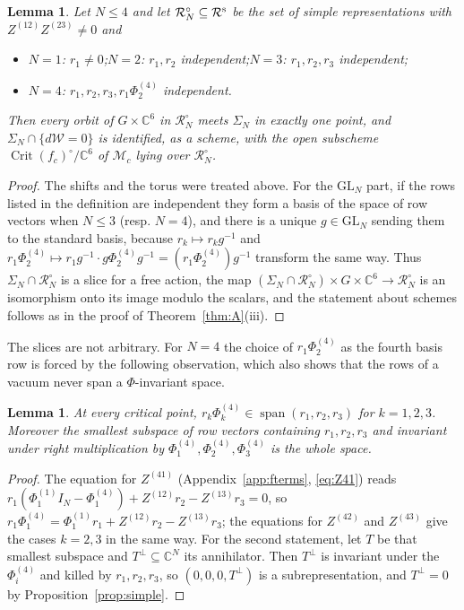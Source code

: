 \documentclass[11pt]{amsart}
\newtheorem{lemma}[theorem]{Lemma}
\theoremstyle{definition}
\newcommand{\CC}{\mathbb{C}}
\newcommand{\Crit}{\operatorname{Crit}}
\newcommand{\cM}{\mathcal M}
\newcommand{\cR}{\mathcal R}
\newcommand{\cW}{\mathcal W}
\newcommand{\GL}{\mathrm{GL}}
\begin{document}
\begin{lemma}\label{lem:slice}
Let $N\le 4$ and let $\cR^\circ_N\subseteq\cR^{\rm s}$ be the set of simple representations with $Z^{(12)}Z^{(23)}\ne0$ and
\begin{itemize}
\item $N=1$: $r_1\ne0$;\quad $N=2$: $r_1,r_2$ independent;\quad $N=3$: $r_1,r_2,r_3$ independent;
\item $N=4$: $r_1,r_2,r_3,r_1\Phi^{(4)}_2$ independent.
\end{itemize}
Then every orbit of $G\times\CC^6$ in $\cR^\circ_N$ meets $\Sigma_N$ in exactly one point, and $\Sigma_N\cap\{d\cW=0\}$ is identified, as a scheme, with the open subscheme $\Crit(f_c)^\circ/\CC^6$ of $\cM_c$ lying over $\cR^\circ_N$.
\end{lemma}

\begin{proof}
The shifts and the torus were treated above. For the $\GL_N$ part, if the rows listed in the definition are independent they form a basis of the space of row vectors when $N\le 3$ (resp. $N=4$), and there is a unique $g\in\GL_N$ sending them to the standard basis, because $r_k\mapsto r_kg^{-1}$ and $r_1\Phi^{(4)}_2\mapsto r_1g^{-1}\cdot g\Phi^{(4)}_2g^{-1}=(r_1\Phi^{(4)}_2)g^{-1}$ transform the same way. Thus $\Sigma_N\cap\cR^\circ_N$ is a slice for a free action, the map $(\Sigma_N\cap\cR^\circ_N)\times G\times\CC^6\to\cR^\circ_N$ is an isomorphism onto its image modulo the scalars, and the statement about schemes follows as in the proof of Theorem~\ref{thm:A}(iii).
\end{proof}

The slices are not arbitrary. For $N=4$ the choice of $r_1\Phi^{(4)}_2$ as the fourth basis row is forced by the following observation, which also shows that the rows of a vacuum never span a $\Phi$-invariant space.

\begin{lemma}\label{lem:rowspan}
At every critical point, $r_k\Phi^{(4)}_k\in\operatorname{span}(r_1,r_2,r_3)$ for $k=1,2,3$. Moreover the smallest subspace of row vectors containing $r_1,r_2,r_3$ and invariant under right multiplication by $\Phi^{(4)}_1,\Phi^{(4)}_2,\Phi^{(4)}_3$ is the whole space.
\end{lemma}

\begin{proof}
The equation for $Z^{(41)}$ (Appendix~\ref{app:fterms}, \eqref{eq:Z41}) reads $r_1(\Phi^{(1)}_1I_N-\Phi^{(4)}_1)+Z^{(12)}r_2-Z^{(13)}r_3=0$, so $r_1\Phi^{(4)}_1=\Phi^{(1)}_1r_1+Z^{(12)}r_2-Z^{(13)}r_3$; the equations for $Z^{(42)}$ and $Z^{(43)}$ give the cases $k=2,3$ in the same way. For the second statement, let $T$ be that smallest subspace and $T^\perp\subseteq\CC^N$ its annihilator. Then $T^\perp$ is invariant under the $\Phi^{(4)}_i$ and killed by $r_1,r_2,r_3$, so $(0,0,0,T^\perp)$ is a subrepresentation, and $T^\perp=0$ by Proposition~\ref{prop:simple}.
\end{proof}
\end{document}

